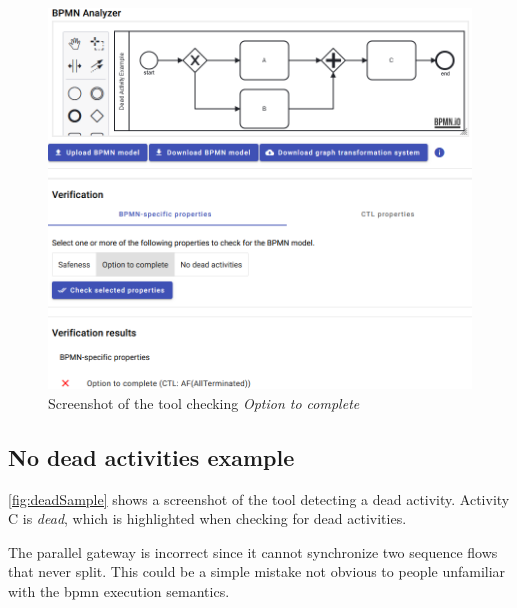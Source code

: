 \documentclass[runningheads]{llncs}
\begin{document}
\begin{figure}[ht]
    \centering
    \includegraphics[width=1\textwidth]{artifacts/option_to_complete_sample.png}
    \caption{Screenshot of the tool checking \textit{Option to complete}}
    \label{fig:optionToCompleteSample}
\end{figure}

\subsection{No dead activities example}
\autoref{fig:deadSample} shows a screenshot of the tool detecting a dead activity.
Activity C is \textit{dead}, which is highlighted when checking for dead activities.

The parallel gateway is incorrect since it cannot synchronize two sequence flows that never split.
This could be a simple mistake not obvious to people unfamiliar with the \gls*{bpmn} execution semantics.
\end{document}
